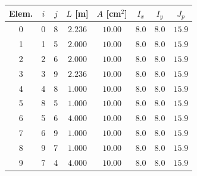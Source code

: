 \documentclass[11pt,a4paper]{article}
\begin{document}
\begin{center}
\begin{minipage}{\linewidth}
\centering
{}\label{tab:viga3d-elementos}
\begin{tabular}{@{}cccccccc@{}}
\toprule
Elem. & $i$ & $j$ & $L$ [m] & $A$ [cm$^2$] & $I_x$ & $I_y$ & $J_p$ \\
\midrule
0 & 0 & 8 & $2.236$ & $10.00$ & $8.0$ & $8.0$ & $15.9$ \\
1 & 1 & 5 & $2.000$ & $10.00$ & $8.0$ & $8.0$ & $15.9$ \\
2 & 2 & 6 & $2.000$ & $10.00$ & $8.0$ & $8.0$ & $15.9$ \\
3 & 3 & 9 & $2.236$ & $10.00$ & $8.0$ & $8.0$ & $15.9$ \\
4 & 4 & 8 & $1.000$ & $10.00$ & $8.0$ & $8.0$ & $15.9$ \\
5 & 8 & 5 & $1.000$ & $10.00$ & $8.0$ & $8.0$ & $15.9$ \\
6 & 5 & 6 & $4.000$ & $10.00$ & $8.0$ & $8.0$ & $15.9$ \\
7 & 6 & 9 & $1.000$ & $10.00$ & $8.0$ & $8.0$ & $15.9$ \\
8 & 9 & 7 & $1.000$ & $10.00$ & $8.0$ & $8.0$ & $15.9$ \\
9 & 7 & 4 & $4.000$ & $10.00$ & $8.0$ & $8.0$ & $15.9$ \\
\bottomrule
\end{tabular}
\end{minipage}
\end{center}
\end{document}

